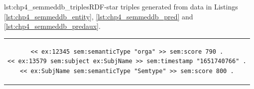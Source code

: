 \noindent\hspace{0.04\linewidth}\begin{minipage}{\linewidth}
\begin{captionedlisting}{lst:chp4_semmeddb_triples}{RDF-star triples generated from data in Listings \ref{lst:chp4_semmeddb_entity}, \ref{lst:chp4_semmeddb_pred} and \ref{lst:chp4_semmeddb_predaux}.}
\centering
\begin{tabular}{c}
\hspace{1em}
{
\begin{lstlisting}[basicstyle=\ttfamily\small,label={list:example1},columns=flexible]
<< ex:12345 sem:semanticType "orga" >> sem:score 790 .
<< ex:13579 sem:subject ex:SubjName >> sem:timestamp "1651740766" .
<< ex:SubjName sem:semanticType "Semtype" >> sem:score 800 .
\end{lstlisting}
}
\end{tabular}
\end{captionedlisting}
\end{minipage}



